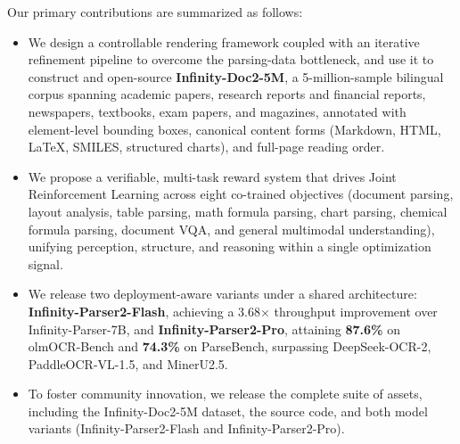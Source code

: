 Our primary contributions are summarized as follows:

\begin{itemize}[
  leftmargin=1.0em, labelsep=0.5em
]
\item We design a controllable rendering framework coupled with an iterative refinement pipeline to overcome the parsing-data bottleneck, and use it to construct and open-source \textbf{Infinity-Doc2-5M}, a 5-million-sample bilingual corpus spanning academic papers, research reports and financial reports, newspapers, textbooks, exam papers, and magazines, annotated with element-level bounding boxes, canonical content forms (Markdown, HTML, LaTeX, SMILES, structured charts), and full-page reading order.

\item We propose a verifiable, multi-task reward system that drives Joint Reinforcement Learning across eight co-trained objectives (document parsing, layout analysis, table parsing, math formula parsing, chart parsing, chemical formula parsing, document VQA, and general multimodal understanding), unifying perception, structure, and reasoning within a single optimization signal.

\item We release two deployment-aware variants under a shared architecture: \textbf{Infinity-Parser2-Flash}, achieving a 3.68$\times$ throughput improvement over Infinity-Parser-7B, and \textbf{Infinity-Parser2-Pro}, attaining \textbf{87.6\%} on olmOCR-Bench and \textbf{74.3\%} on ParseBench, surpassing DeepSeek-OCR-2, PaddleOCR-VL-1.5, and MinerU2.5.

\item To foster community innovation, we release the complete suite of assets, including the Infinity-Doc2-5M dataset, the source code, and both model variants (Infinity-Parser2-Flash and Infinity-Parser2-Pro).

\end{itemize}